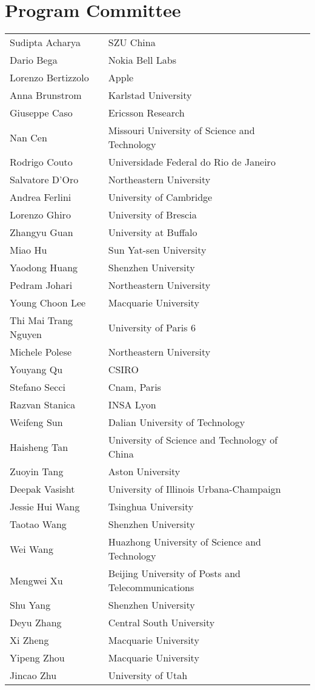 \documentclass{easychair}
\begin{document}
\section*{Program Committee}
\noindent
\begin{longtable}{p{}p{}}
Sudipta Acharya & SZU China\\
Dario Bega & Nokia Bell Labs\\
Lorenzo Bertizzolo & Apple\\
Anna Brunstrom & Karlstad University\\
Giuseppe Caso & Ericsson Research\\
Nan Cen & Missouri University of Science and Technology\\
Rodrigo Couto & Universidade Federal do Rio de Janeiro\\
Salvatore D'Oro & Northeastern University\\
Andrea Ferlini & University of Cambridge\\
Lorenzo Ghiro & University of Brescia\\
Zhangyu Guan & University at Buffalo\\
Miao Hu & Sun Yat-sen University\\
Yaodong Huang & Shenzhen University\\
Pedram Johari & Northeastern University\\
Young Choon Lee & Macquarie University\\
Thi Mai Trang Nguyen & University of Paris 6\\
Michele Polese & Northeastern University\\
Youyang Qu & CSIRO\\
Stefano Secci & Cnam, Paris\\
Razvan Stanica & INSA Lyon\\
Weifeng Sun & Dalian University of Technology\\
Haisheng Tan & University of Science and Technology of China\\
Zuoyin Tang & Aston University\\
Deepak Vasisht & University of Illinois Urbana-Champaign\\
Jessie Hui Wang & Tsinghua University\\
Taotao Wang & Shenzhen University\\
Wei Wang & Huazhong University of Science and Technology\\
Mengwei Xu & Beijing University of Posts and Telecommunications\\
Shu Yang & Shenzhen University\\
Deyu Zhang & Central South University\\
Xi Zheng & Macquarie University\\
Yipeng Zhou & Macquarie University\\
Jincao Zhu & University of Utah\\
\end{longtable}
\end{document}
